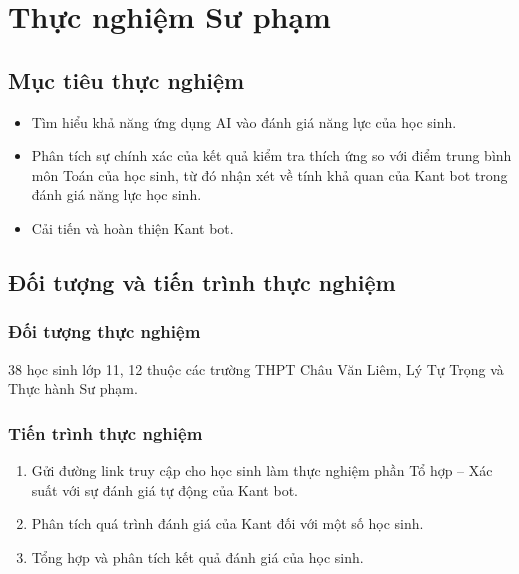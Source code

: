 \chapter{Thực nghiệm Sư phạm}

\section{Mục tiêu thực nghiệm}\begin{itemize}
	\item Tìm hiểu khả năng ứng dụng AI vào đánh giá năng lực của học sinh.
	\item Phân tích sự chính xác của kết quả kiểm tra thích ứng so với điểm trung bình môn Toán của học sinh, từ đó nhận xét về tính khả quan của Kant bot trong đánh giá năng lực học sinh.
	\item Cải tiến và hoàn thiện Kant bot.
\end{itemize}

\section{Đối tượng và tiến trình thực nghiệm}
\subsection{Đối tượng thực nghiệm}
	38 học sinh lớp 11, 12 thuộc các trường THPT Châu Văn Liêm, Lý Tự Trọng và Thực hành Sư phạm.

\subsection{Tiến trình thực nghiệm}
\begin{enumerate}[label=\textbf{Giai đoạn \arabic*.},align=left,left=0cm..0cm,itemindent=*]
	\item Gửi đường link truy cập cho học sinh làm thực nghiệm phần Tổ hợp – Xác suất với sự đánh giá tự động của Kant bot.\par
	\item Phân tích quá trình đánh giá của Kant đối với một số học sinh.
	\item Tổng hợp và phân tích kết quả đánh giá của học sinh.
\end{enumerate}

